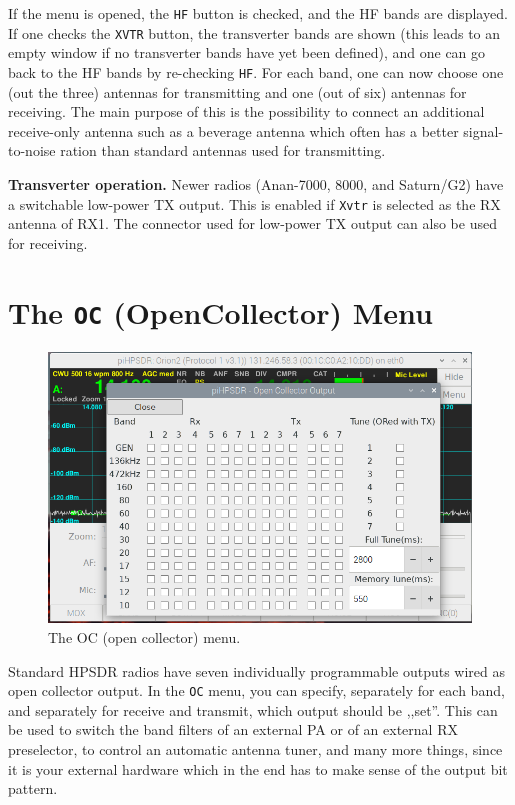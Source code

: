 \documentclass[12pt]{book}
\def\rett#1{\texttt{\color{red}#1}}
\def\bltt#1{\texttt{\color{blue}#1}}
\begin{document}
 If the menu is opened, the \rett{HF} button is checked, and the HF bands
 are displayed. If one checks the \rett{XVTR} button, the transverter bands
 are shown (this leads to an empty window if no transverter bands have
 yet been defined), and one can go back to the HF bands by re-checking
 \rett{HF}.
 For each band, one can now choose one (out the three) antennas for
 transmitting and one (out of six) antennas for receiving. The main purpose
 of this is the possibility to connect an additional receive-only antenna
such as a beverage antenna which often has a better signal-to-noise
 ration than standard antennas used for transmitting.
 
\textbf{Transverter operation.} Newer radios (Anan-7000, 8000, and Saturn/G2) have a
switchable low-power TX output. This is enabled if \rett{Xvtr} is selected as the RX antenna of RX1.
The connector used for low-power TX output can also be used for receiving.



\section{The \texttt{OC} (OpenCollector) Menu}

\begin{figure}[ht]
\center
\includegraphics[width=12cm]{OCMenu.png}
\caption{The OC (open collector) menu.}
\label{fig:OCMenu}
\end{figure}

Standard HPSDR radios have seven individually programmable outputs wired as
open collector output. In the \bltt{OC} menu, you can specify, separately
for each band, and separately for receive and transmit, which output should
be ,,set''. This can be used to switch the band filters of an external PA
or of an external RX preselector, to control an automatic antenna tuner,
and many more things, since it is
your external hardware which in the end has to make sense of the output
bit pattern.
\end{document}
